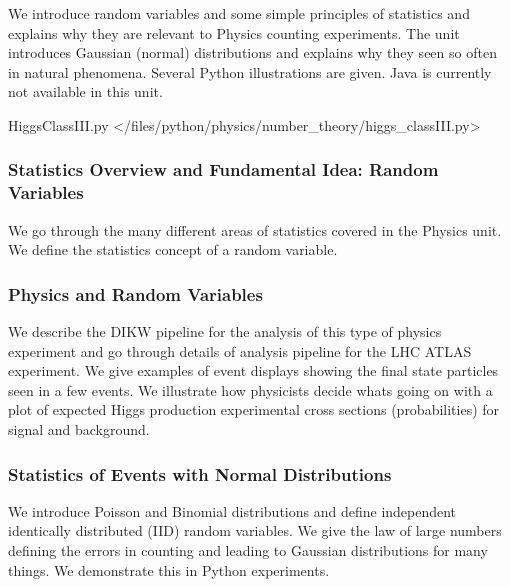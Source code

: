 We introduce random variables and some simple principles of statistics
and explains why they are relevant to Physics counting experiments. The
unit introduces Gaussian (normal) distributions and explains why they
seen so often in natural phenomena. Several Python illustrations are
given. Java is currently not available in this unit.


HiggsClassIII.py \textless{}/files/python/physics/number\_theory/higgs\_classIII.py\textgreater{}

\subsubsection{Statistics Overview and Fundamental Idea: Random
Variables}\label{statistics-overview-and-fundamental-idea-random-variables}

We go through the many different areas of statistics covered in the
Physics unit. We define the statistics concept of a random variable.


\subsubsection{Physics and Random
Variables}\label{physics-and-random-variables}

We describe the DIKW pipeline for the analysis of this type of physics
experiment and go through details of analysis pipeline for the LHC ATLAS
experiment. We give examples of event displays showing the final state
particles seen in a few events. We illustrate how physicists decide
whats going on with a plot of expected Higgs production experimental
cross sections (probabilities) for signal and background.



\subsubsection{Statistics of Events with Normal
Distributions}\label{statistics-of-events-with-normal-distributions}

We introduce Poisson and Binomial distributions and define independent
identically distributed (IID) random variables. We give the law of large
numbers defining the errors in counting and leading to Gaussian
distributions for many things. We demonstrate this in Python
experiments.

